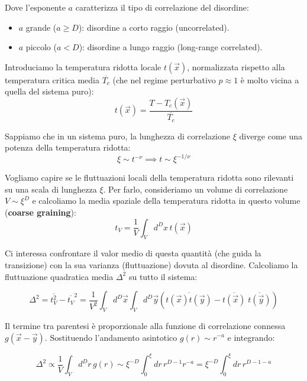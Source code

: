 Dove l'esponente $a$ caratterizza il tipo di correlazione del disordine:
\begin{itemize}
    \item $a$ grande ($a \ge D$): disordine a corto raggio (uncorrelated).
    \item $a$ piccolo ($a < D$): disordine a lungo raggio (long-range correlated).
\end{itemize}

Introduciamo la temperatura ridotta locale $t(\vec{x})$, normalizzata rispetto alla temperatura critica media $\overline{T_c}$ (che nel regime perturbativo $p \approx 1$ è molto vicina a quella del sistema puro):
\begin{equation}
t(\vec{x}) = \frac{T - T_c(\vec{x})}{\overline{T_c}}
\end{equation}

Sappiamo che in un sistema puro, la lunghezza di correlazione $\xi$ diverge come una potenza della temperatura ridotta:
\begin{equation}
\xi \sim t^{-\nu} \implies t \sim \xi^{-1/\nu}
\end{equation}

Vogliamo capire se le fluttuazioni locali della temperatura ridotta sono rilevanti su una scala di lunghezza $\xi$. Per farlo, consideriamo un volume di correlazione $V \sim \xi^D$ e calcoliamo la media spaziale della temperatura ridotta in questo volume (\textbf{coarse graining}):
\begin{equation}
t_V = \frac{1}{V} \int_V d^D x \, t(\vec{x})
\end{equation}

Ci interessa confrontare il valor medio di questa quantità (che guida la transizione) con la sua varianza (fluttuazione) dovuta al disordine. Calcoliamo la fluttuazione quadratica media $\Delta^2$ su tutto il sistema:

\begin{equation}
\Delta^2 = \overline{t_V^2} - \overline{t_V}^2 = \frac{1}{V^2} \int_V d^D \vec{x} \int_V d^D \vec{y} \left( \overline{t(\vec{x})t(\vec{y})} - \overline{t(\vec{x})} \; \overline{t(\vec{y})} \right)
\end{equation}

Il termine tra parentesi è proporzionale alla funzione di correlazione connessa $g(\vec{x}-\vec{y})$. Sostituendo l'andamento asintotico $g(r) \sim r^{-a}$ e integrando:

\begin{equation}
\Delta^2 \propto \frac{1}{V} \int_V d^D r \, g(r) \sim \xi^{-D} \int_0^\xi dr \, r^{D-1} r^{-a} = \xi^{-D} \int_0^\xi dr \, r^{D-1-a}
\end{equation}

